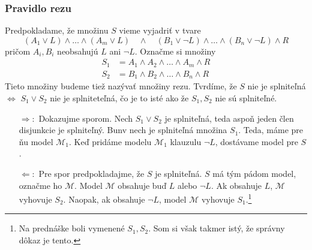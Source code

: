 \subsubsection{Pravidlo rezu}
Predpokladame, že množinu $S$ vieme vyjadriť v tvare
\begin{equation*}
    (A_1 \lor L) \land \ldots \land (A_m \lor L) \quad \land \quad
    (B_1 \lor \neg L) \land \ldots \land (B_n \lor \neg L) \land R
\end{equation*}
pričom $A_i, B_i$ neobsahujú $L$ ani $\neg L$.
Označme si množiny
\begin{align*}
    S_1 &= A_1 \land A_2 \land \ldots \land A_m \land R \\
    S_2 &= B_1 \land B_2 \land \ldots \land B_n \land R
\end{align*}
Tieto množiny budeme tiež nazývať množiny rezu.
Tvrdíme, že $S$ nie je splniteľná $\iff$ $S_1 \lor S_2$ nie je
splniteteľná, čo je to isté ako že $S_1,S_2$ nie sú splniteľné.

\begin{dokaz}
    \noindent
    \begin{itemize}
    \item[$\Rightarrow:$] Dokazujme sporom.
        Nech $S_1 \lor S_2$ je splniteľná, 
        teda aspoň jeden člen disjunkcie je splniteľný.
        Bunv nech je splniteľná množina $S_1$. Teda, máme pre ňu model
        $\mathcal{M}_1$. Keď pridáme modelu $\mathcal{M}_1$ 
        klauzulu $\neg L$, dostávame model pre $S$.

    \item[$\Leftarrow:$] Pre spor predpokladajme, že $S$ je splniteľná.
        $S$ má tým pádom model, označme ho $\mathcal{M}$.
        Model $\mathcal{M}$ obsahuje buď $L$ alebo $\neg L$.
        Ak obsahuje $L$, $\mathcal{M}$ vyhovuje $S_2$. Naopak, ak
        obsahuje $\neg L$, model $\mathcal{M}$ vyhovuje
        $S_1$.\footnote{Na prednáške boli vymenené $S_1,S_2$. Som si
        však takmer istý, že správny dôkaz je tento.}
    \end{itemize}
\end{dokaz}

